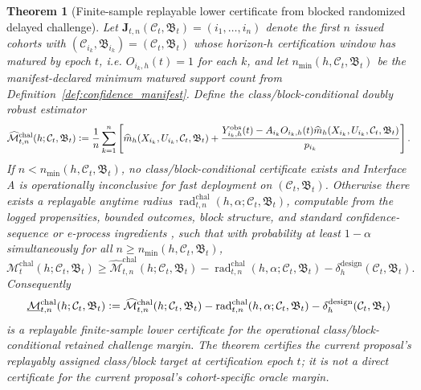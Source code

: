 \documentclass[11pt]{article}
\newtheorem{theorem}{Theorem}[section]
\theoremstyle{definition}
\newcommand{\1}{\mathbf{1}}
\newcommand{\Defeq}{\vcentcolon=}
\begin{document}
\begin{theorem}[Finite-sample replayable lower certificate from blocked randomized delayed challenge]
Let $\mathbf J_{t,n}(\mathcal C_t,\mathfrak B_t)=(i_1,\dots,i_n)$ denote the first $n$ issued cohorts with $(\mathcal C_{i_k},\mathfrak B_{i_k})=(\mathcal C_t,\mathfrak B_t)$ whose horizon-$h$ certification window has matured by epoch $t$, i.e. $O_{i_k,h}(t)=1$ for each $k$, and let $n_{\min}(h,\mathcal C_t,\mathfrak B_t)$ be the manifest-declared minimum matured support count from Definition~\ref{def:confidence_manifest}. Define the class/block-conditional doubly robust estimator
\[
\widehat{\mathcal M}_{t,n}^{\mathrm{chal}}(h;\mathcal C_t,\mathfrak B_t)
\Defeq
\frac1n\sum_{k=1}^{n}\left[\widehat m_h(X_{i_k},U_{i_k},\mathcal C_t,\mathfrak B_t)+\frac{Y_{i_k,h}^{\mathrm{obs}}(t)-A_{i_k}O_{i_k,h}(t)\widehat m_h(X_{i_k},U_{i_k},\mathcal C_t,\mathfrak B_t)}{p_{i_k}}\right].
\]
If $n<n_{\min}(h,\mathcal C_t,\mathfrak B_t)$, no class/block-conditional certificate exists and Interface A is operationally inconclusive for fast deployment on $(\mathcal C_t,\mathfrak B_t)$. Otherwise there exists a replayable anytime radius $\operatorname{rad}_{t,n}^{\mathrm{chal}}(h,\alpha;\mathcal C_t,\mathfrak B_t)$, computable from the logged propensities, bounded outcomes, block structure, and standard confidence-sequence or e-process ingredients \cite{HowardRamdasMcAuliffeSekhon2021,RamdasGrunwaldVovkShafer2023,ZhanHadadHirshbergAthey2021}, such that with probability at least $1-\alpha$ simultaneously for all $n\ge n_{\min}(h,\mathcal C_t,\mathfrak B_t)$,
\[
\mathcal M_t^{\mathrm{chal}}(h;\mathcal C_t,\mathfrak B_t)
\ge
\widehat{\mathcal M}_{t,n}^{\mathrm{chal}}(h;\mathcal C_t,\mathfrak B_t)
-\operatorname{rad}_{t,n}^{\mathrm{chal}}(h,\alpha;\mathcal C_t,\mathfrak B_t)
-\delta_h^{\mathrm{design}}(\mathcal C_t,\mathfrak B_t).
\]
Consequently
\[
\underline{\mathcal M}_{t,n}^{\mathrm{chal}}(h;\mathcal C_t,\mathfrak B_t)
\Defeq
\widehat{\mathcal M}_{t,n}^{\mathrm{chal}}(h;\mathcal C_t,\mathfrak B_t)
-\operatorname{rad}_{t,n}^{\mathrm{chal}}(h,\alpha;\mathcal C_t,\mathfrak B_t)
-\delta_h^{\mathrm{design}}(\mathcal C_t,\mathfrak B_t)
\]
is a replayable finite-sample lower certificate for the operational class/block-conditional retained challenge margin. The theorem certifies the current proposal's replayably assigned class/block target at certification epoch $t$; it is not a direct certificate for the current proposal's cohort-specific oracle margin.
\end{theorem}
\end{document}
